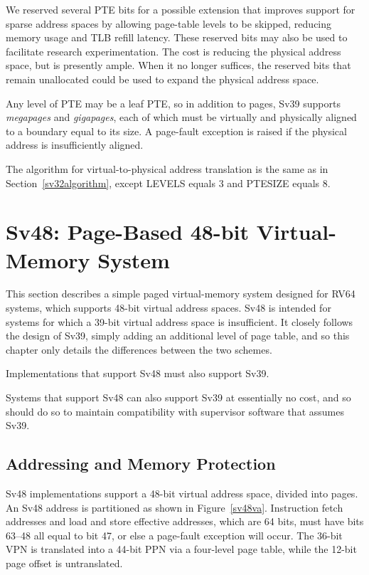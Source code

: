 \begin{commentary}
We reserved several PTE bits for a possible extension that improves
support for sparse address spaces by allowing page-table levels to be
skipped, reducing memory usage and TLB refill latency.  These reserved
bits may also be used to facilitate research experimentation.  The
cost is reducing the physical address space, but  is
presently ample.  When it no longer suffices, the reserved
bits that remain unallocated could be used to expand the physical
address space.
\end{commentary}

Any level of PTE may be a leaf PTE, so in addition to 
pages, Sv39 supports  {\em megapages} and
 {\em gigapages}, each of which must be virtually and
physically aligned to a boundary equal to its size.
A page-fault exception is raised if the physical address is insufficiently
aligned.

The algorithm for virtual-to-physical address translation is the same as in
Section~\ref{sv32algorithm}, except LEVELS equals 3 and PTESIZE equals 8.

\section{Sv48: Page-Based 48-bit Virtual-Memory System}
\label{sec:sv48}

This section describes a simple paged virtual-memory system designed
for RV64 systems, which supports 48-bit virtual address spaces.  Sv48
is intended for systems for which a 39-bit virtual address space is
insufficient.  It closely follows the design of Sv39, simply adding an
additional level of page table, and so this chapter only details the
differences between the two schemes.

Implementations that support Sv48 must also support Sv39.

\begin{commentary}
Systems that support Sv48 can also support Sv39 at essentially no cost, and so
should do so to maintain compatibility with supervisor software that assumes
Sv39.
\end{commentary}

\subsection{Addressing and Memory Protection}

Sv48 implementations support a 48-bit virtual address space, divided
into  pages.  An Sv48 address is partitioned as
shown in Figure~\ref{sv48va}.
Instruction fetch addresses and load and store effective addresses,
which are 64 bits, must have bits 63--48 all equal to bit 47, or else
a page-fault exception will occur.  The 36-bit VPN is translated into a
44-bit PPN via a four-level page table, while the 12-bit page offset
is untranslated.

